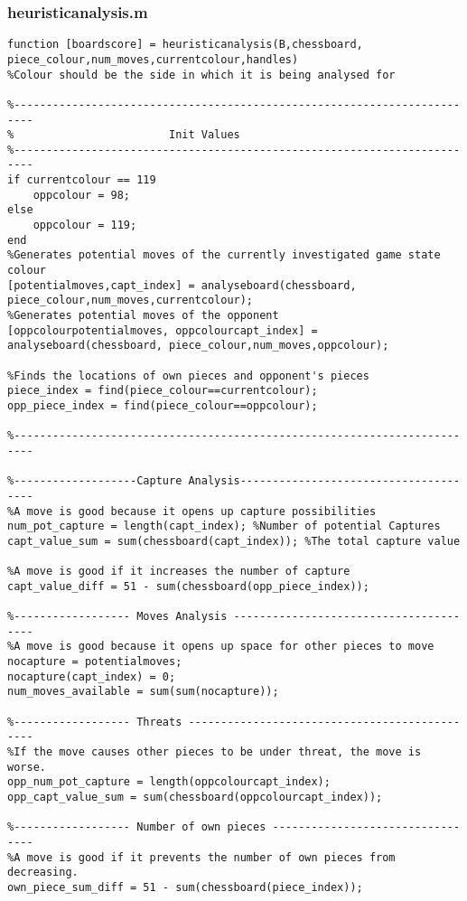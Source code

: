 \documentclass{article}
\begin{document}
\subsubsection{heuristicanalysis.m}
\begin{lstlisting}
function [boardscore] = heuristicanalysis(B,chessboard, piece_colour,num_moves,currentcolour,handles)
%Colour should be the side in which it is being analysed for

%-------------------------------------------------------------------------
%                        Init Values
%-------------------------------------------------------------------------
if currentcolour == 119
    oppcolour = 98;
else
    oppcolour = 119;
end
%Generates potential moves of the currently investigated game state colour
[potentialmoves,capt_index] = analyseboard(chessboard, piece_colour,num_moves,currentcolour);
%Generates potential moves of the opponent
[oppcolourpotentialmoves, oppcolourcapt_index] = analyseboard(chessboard, piece_colour,num_moves,oppcolour);

%Finds the locations of own pieces and opponent's pieces
piece_index = find(piece_colour==currentcolour);
opp_piece_index = find(piece_colour==oppcolour);

%-------------------------------------------------------------------------

%-------------------Capture Analysis--------------------------------------
%A move is good because it opens up capture possibilities
num_pot_capture = length(capt_index); %Number of potential Captures
capt_value_sum = sum(chessboard(capt_index)); %The total capture value

%A move is good if it increases the number of capture 
capt_value_diff = 51 - sum(chessboard(opp_piece_index));

%------------------ Moves Analysis ---------------------------------------
%A move is good because it opens up space for other pieces to move
nocapture = potentialmoves;
nocapture(capt_index) = 0;
num_moves_available = sum(sum(nocapture));

%------------------ Threats ----------------------------------------------
%If the move causes other pieces to be under threat, the move is worse.
opp_num_pot_capture = length(oppcolourcapt_index);
opp_capt_value_sum = sum(chessboard(oppcolourcapt_index)); 

%------------------ Number of own pieces ---------------------------------
%A move is good if it prevents the number of own pieces from decreasing.
own_piece_sum_diff = 51 - sum(chessboard(piece_index)); 



\end{lstlisting}
\end{document}
